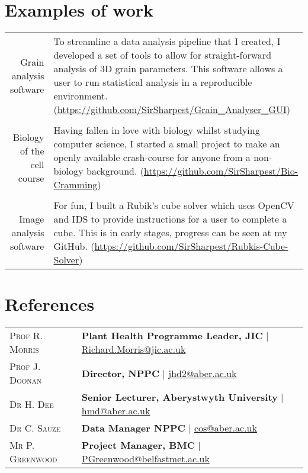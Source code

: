 \documentclass[a4paper,10pt]{article}
\begin{document}
\section{Examples of work}



\begin{tabular}{r|p{10cm}}

  Grain analysis software  & To streamline a data analysis pipeline that I created, I developed a set of tools to allow for straight-forward analysis of 3D grain parameters. This software allows a user to run statistical analysis in a reproducible environment. (\href{https://github.com/SirSharpest/Grain\_Analyser\_GUI}{https://github.com/SirSharpest/Grain\_Analyser\_GUI})\\
\\
  Biology of the cell course & Having fallen in love with biology whilst studying computer science, I started a small project to make an openly available crash-course for anyone from a non-biology background. (\href{https://github.com/SirSharpest/Bio-Cramming}{https://github.com/SirSharpest/Bio-Cramming})\\
  \\
  Image analysis software& For fun, I built a  Rubik's cube solver which uses OpenCV and IDS to provide instructions for a user to complete a cube. This is in early stages, progress can be seen at my GitHub. (\href{https://github.com/SirSharpest/Rubkis-Cube-Solver}{https://github.com/SirSharpest/Rubkis-Cube-Solver})
\end{tabular}

\section{References}
\begin{tabular}{ll}
  \textsc{Prof R. Morris} & \textbf{Plant Health Programme Leader, JIC
} | \href{Richard.Morris@jic.ac.uk}{Richard.Morris@jic.ac.uk}
  \\
  \textsc{Prof J. Doonan} & \textbf{Director, NPPC} | \href{jhd2@aber.ac.uk}{jhd2@aber.ac.uk}
  \\
  \textsc{Dr H. Dee} & \textbf{Senior Lecturer, Aberystwyth University} | \href{hmd@aber.ac.uk}{hmd@aber.ac.uk}
  \\
  \textsc{Dr C. Sauze} & \textbf{Data Manager NPPC} | \href{cos@aber.ac.uk}{cos@aber.ac.uk}
\\
  \textsc{Mr P. Greenwood} & \textbf{Project Manager, BMC} | \href{PGreenwood@belfastmet.ac.uk}{PGreenwood@belfastmet.ac.uk}
  \\
\end{tabular}
\end{document}
